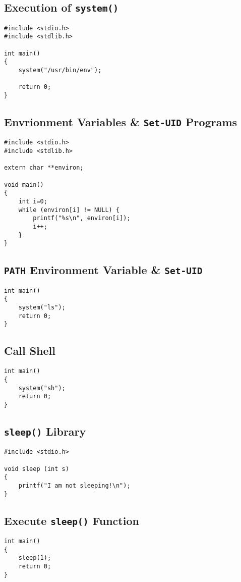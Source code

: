 \documentclass[a4paper,12pt]{article}
\begin{document}
\subsection{Execution of \texttt{system()}}
\label{Appsec:3.4}
\begin{verbatim}
#include <stdio.h>
#include <stdlib.h>

int main()
{
    system("/usr/bin/env");

    return 0;
}
\end{verbatim}
\subsection{Envrionment Variables \& \texttt{Set-UID} Programs}
\label{Appsec:3.5}
\begin{verbatim}
#include <stdio.h>
#include <stdlib.h>

extern char **environ;

void main()
{
    int i=0;
    while (environ[i] != NULL) {
        printf("%s\n", environ[i]);
        i++;
    }
}
\end{verbatim}
\subsection{\texttt{PATH} Environment Variable \& \texttt{Set-UID}}
\label{Appsec:3.6}
\begin{verbatim}
int main()
{
    system("ls");
    return 0;
}
\end{verbatim}
\subsection{Call Shell}
\label{Appsec:3.6.2}
\begin{verbatim}
int main()
{
    system("sh");
    return 0;
}
\end{verbatim}
\subsection{\texttt{sleep()} Library}
\label{Appsec:3.7}
\begin{verbatim}
#include <stdio.h>

void sleep (int s)
{
    printf("I am not sleeping!\n");
}
\end{verbatim}
\subsection{Execute \texttt{sleep()} Function}
\begin{verbatim}
int main()
{
    sleep(1);
    return 0;
}
\end{verbatim}
\newpage
\end{document}
